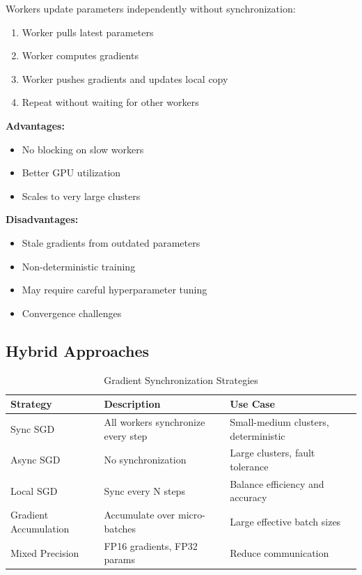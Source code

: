 Workers update parameters independently without synchronization:

\begin{enumerate}
    \item Worker pulls latest parameters
    \item Worker computes gradients
    \item Worker pushes gradients and updates local copy
    \item Repeat without waiting for other workers
\end{enumerate}

\textbf{Advantages:}
\begin{itemize}
    \item No blocking on slow workers
    \item Better GPU utilization
    \item Scales to very large clusters
\end{itemize}

\textbf{Disadvantages:}
\begin{itemize}
    \item Stale gradients from outdated parameters
    \item Non-deterministic training
    \item May require careful hyperparameter tuning
    \item Convergence challenges
\end{itemize}

\subsection{Hybrid Approaches}

\begin{table}[h]
\centering
\caption{Gradient Synchronization Strategies}
\label{tab:sync_strategies}
\small
\begin{tabular}{@{}lp{4cm}p{4cm}@{}}
\toprule
\textbf{Strategy} & \textbf{Description} & \textbf{Use Case} \\
\midrule
Sync SGD & All workers synchronize every step & Small-medium clusters, deterministic \\
Async SGD & No synchronization & Large clusters, fault tolerance \\
Local SGD & Sync every N steps & Balance efficiency and accuracy \\
Gradient Accumulation & Accumulate over micro-batches & Large effective batch sizes \\
Mixed Precision & FP16 gradients, FP32 params & Reduce communication \\
\bottomrule
\end{tabular}
\end{table}

